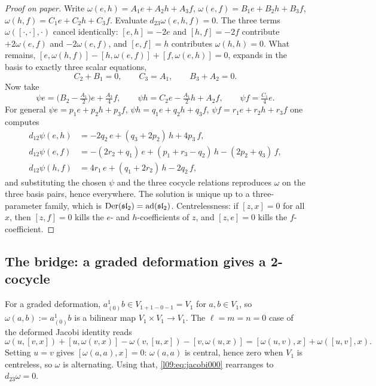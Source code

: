 \begin{proof}[Proof on paper]
Write $\omega(e,h) = A_1e+A_2h+A_3f$, $\omega(e,f) = B_1e+B_2h+B_3f$, $\omega(h,f) = C_1e+C_2h+C_3f$.
Evaluate $d_{23}\omega(e,h,f) = 0$. The three terms $\omega([\cdot,\cdot],\cdot)$ cancel identically:
$[e,h] = -2e$ and $[h,f] = -2f$ contribute $+2\omega(e,f)$ and $-2\omega(e,f)$, and $[e,f] = h$
contributes $\omega(h,h)=0$. What remains, $[e,\omega(h,f)] - [h,\omega(e,f)] + [f,\omega(e,h)] = 0$,
expands in the basis to exactly three scalar equations,
\begin{equation*}
  C_2 + B_1 = 0,\qquad C_3 = A_1,\qquad B_3 + A_2 = 0 .
\end{equation*}
Now take
\begin{equation*}
  \psi e = \bigl(B_2 - \tfrac{A_1}{2}\bigr)e + \tfrac{A_3}{4}f,\qquad
  \psi h = C_2 e - \tfrac{A_1}{2}h + A_2 f,\qquad
  \psi f = \tfrac{C_1}{4}e .
\end{equation*}
For general $\psi e = p_1e+p_2h+p_3f$, $\psi h = q_1e+q_2h+q_3f$, $\psi f = r_1e+r_2h+r_3f$ one computes
\begin{align*}
  d_{12}\psi(e,h) &= -2q_2\,e + (q_3+2p_2)\,h + 4p_3\,f,\\
  d_{12}\psi(e,f) &= -(2r_2+q_1)\,e + (p_1+r_3-q_2)\,h - (2p_2+q_3)\,f,\\
  d_{12}\psi(h,f) &= 4r_1\,e + (q_1+2r_2)\,h - 2q_2\,f,
\end{align*}
and substituting the chosen $\psi$ and the three cocycle relations reproduces $\omega$ on the three
basis pairs, hence everywhere. The solution is unique up to a three-parameter family, which is
$\operatorname{Der}(\mathfrak{sl}_2) = \operatorname{ad}(\mathfrak{sl}_2)$. Centrelessness: if $[z,x] = 0$ for all $x$, then $[z,f] = 0$
kills the $e$- and $h$-coefficients of $z$, and $[z,e]=0$ kills the $f$-coefficient.
\end{proof}

\subsection{The bridge: a graded deformation gives a 2-cocycle}

For a graded deformation, $a^1_{(0)}b\in V_{1+1-0-1} = V_1$ for $a,b\in V_1$, so
$\omega(a,b) := a^1_{(0)}b$ is a bilinear map $V_1\times V_1\to V_1$. The $\ell=m=n=0$ case of the
deformed Jacobi identity reads
\begin{equation}\label{l09:eq:jacobi000}
  \omega(u,[v,x]) + [u,\omega(v,x)] - \omega(v,[u,x]) - [v,\omega(u,x)]
  = [\omega(u,v),x] + \omega([u,v],x).
\end{equation}
Setting $u=v$ gives $[\omega(a,a),x] = 0$: $\omega(a,a)$ is central, hence zero when $V_1$ is
centreless, so $\omega$ is alternating. Using that, \eqref{l09:eq:jacobi000} rearranges to
$d_{23}\omega = 0$.

